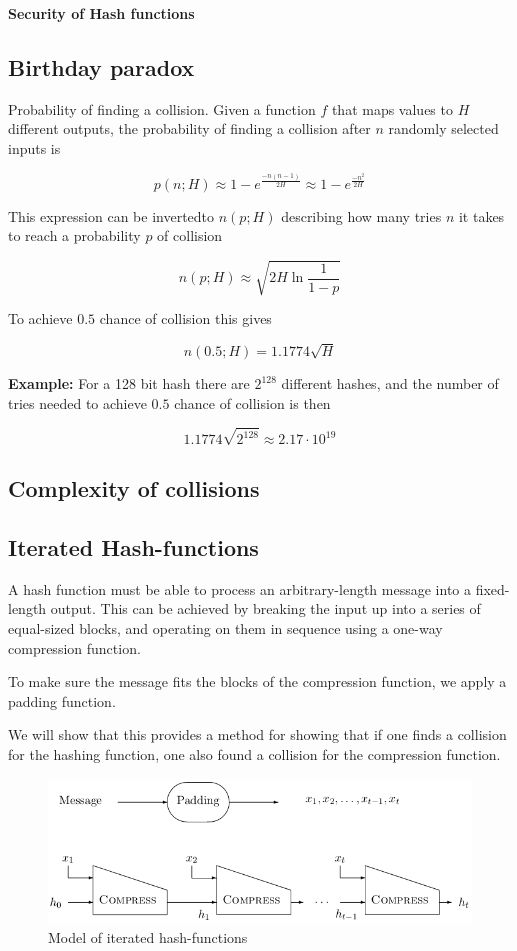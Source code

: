 \textbf{Security of Hash functions}



\subsection{Birthday paradox}
Probability of finding a collision. Given a function $f$ that maps
values to $H$ different outputs, the probability of finding a
collision after $n$ randomly selected inputs is

\[ p(n; H) \approx 1 - e^{\frac{-n(n-1)}{2H}} \approx 1 - e^{\frac{-n^2}{2H}} \]

This expression can be invertedto $n(p; H)$ describing how many tries
$n$ it takes to reach a probability $p$ of collision

\[ n(p; H) \approx \sqrt{2H \ln \frac{1}{1 - p}} \]

To achieve $0.5$ chance of collision this gives

\[ n(0.5; H) = 1.1774 \sqrt{H} \]

\textbf{Example:} For a 128 bit hash there are $2^{128}$ different
hashes, and the number of tries needed to achieve $0.5$ chance of
collision is then

\[ 1.1774 \sqrt{2^{128}} \approx 2.17 \cdot 10^{19} \]

\subsection{Complexity of collisions}

\subsection{Iterated Hash-functions}
A hash function must be able to process an arbitrary-length message
into a fixed-length output. This can be achieved by breaking the input
up into a series of equal-sized blocks, and operating on them in
sequence using a one-way compression function.

To make sure the message fits the blocks of the compression function,
we apply a padding function.

We will show that this provides a method for showing that if one finds
a collision for the hashing function, one also found a collision for
the compression function.

\begin{figure}[H]
  \begin{centering}
    \includegraphics[width=12cm]{images/10-it-hash}
    \caption{Model of iterated hash-functions}
  \end{centering}
\end{figure}

